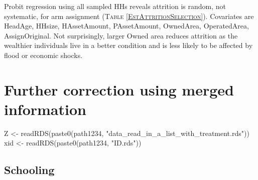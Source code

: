 Probit regression using all sampled HHs reveals attrition is random, not systematic, for arm assignment (\textsc{\footnotesize Table \ref{EstAttritionSelection}}). Covariates are \textsf{HeadAge, HHsize, HAssetAmount, PAssetAmount, OwnedArea, OperatedArea, AssignOriginal}. Not surprisingly, larger \textsf{Owned area} reduces attrition as the wealthier individuals live in a better condition and is less likely to be affected by flood or economic shocks. \gobblepars



\section{Further correction using merged information}

\begin{Schunk}
\begin{Sinput}
Z <- readRDS(paste0(path1234, "data_read_in_a_list_with_treatment.rds"))
xid <- readRDS(paste0(path1234, "ID.rds"))
\end{Sinput}
\end{Schunk}



\subsection{Schooling}




